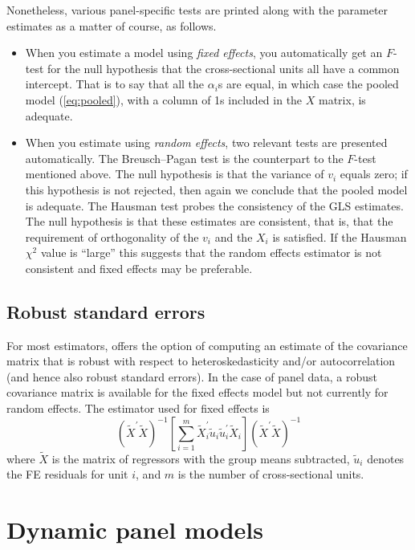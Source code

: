 Nonetheless, various panel-specific tests are printed along with the
parameter estimates as a matter of course, as follows.

\begin{itemize}
\item When you estimate a model using \textsl{fixed effects}, you
  automatically get an $F$-test for the null hypothesis that the
  cross-sectional units all have a common intercept.  That is to say
  that all the $\alpha_i$s are equal, in which case the pooled model
  (\ref{eq:pooled}), with a column of 1s included in the $X$ matrix,
  is adequate.
\item When you estimate using \textsl{random effects}, two relevant
  tests are presented automatically.  The Breusch--Pagan test is the
  counterpart to the $F$-test mentioned above.  The null hypothesis is
  that the variance of $v_i$ equals zero; if this hypothesis is not
  rejected, then again we conclude that the pooled model is adequate.
  The Hausman test probes the consistency of the GLS estimates.  The
  null hypothesis is that these estimates are consistent, that is,
  that the requirement of orthogonality of the $v_i$ and the $X_i$ is
  satisfied.  If the Hausman $\chi^2$ value is ``large'' this suggests
  that the random effects estimator is not consistent and fixed
  effects may be preferable.
\end{itemize}


\subsection{Robust standard errors}
\label{panel-robust}

For most estimators,  offers the option of computing an
estimate of the covariance matrix that is robust with respect to
heteroskedasticity and/or autocorrelation (and hence also robust
standard errors).  In the case of panel data, a robust covariance
matrix is available for the fixed effects model but not currently for
random effects.  The estimator used for fixed effects is
\[
\left(\tilde{X}^{\prime}\tilde{X}\right)^{-1}
\left[ \sum_{i=1}^m \tilde{X}_i^{\prime} \tilde{u}_i 
    \tilde{u}_i^{\prime} \tilde{X}_i \right]
\left(\tilde{X}^{\prime}\tilde{X}\right)^{-1}
\]
where $\tilde{X}$ is the matrix of regressors with the group means
subtracted, $\tilde{u}_i$ denotes the FE residuals for unit $i$, and $m$
is the number of cross-sectional units.

\section{Dynamic panel models}
\label{panel-dyn}

